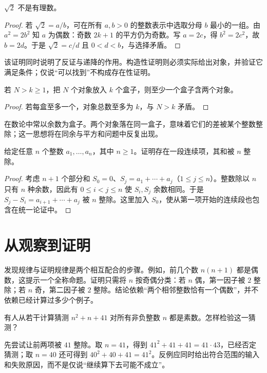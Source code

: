\documentclass[UTF8,12pt,a4paper,fontset=fandol]{ctexbook}
\begin{document}
\begin{example}
$\sqrt2$ 不是有理数。
\end{example}
\begin{proof}
若 $\sqrt2=a/b$，可在所有 $a,b>0$ 的整数表示中选取分母 $b$ 最小的一组。由 $a^2=2b^2$ 知 $a$ 为偶数：奇数 $2k+1$ 的平方仍为奇数。写 $a=2c$，得 $b^2=2c^2$，故 $b=2d$。于是 $\sqrt2=c/d$ 且 $0<d<b$，与选择矛盾。
\end{proof}

该证明同时说明了反证与递降的作用。构造性证明则必须实际给出对象，并验证它满足条件；仅说“可以找到”不构成存在性证明。

\begin{proposition}[抽屉原理]
若 $N>k\ge1$，把 $N$ 个对象放入 $k$ 个盒子，则至少一个盒子含两个对象。
\end{proposition}
\begin{proof}
若每盒至多一个，对象总数至多为 $k$，与 $N>k$ 矛盾。
\end{proof}

在数论中常以余数为盒子。两个对象落在同一盒子，意味着它们的差被某个整数整除；这一思想将在同余与平方和问题中反复出现。

\begin{example}[从部分和中寻找整除关系]
给定任意 $n$ 个整数 $a_1,\ldots,a_n$，其中 $n\ge1$。证明存在一段连续项，其和被 $n$ 整除。
\end{example}
\begin{proof}
考虑 $n+1$ 个部分和 $S_0=0$、$S_j=a_1+\cdots+a_j$（$1\le j\le n$）。整数除以 $n$ 只有 $n$ 种余数，因此有 $0\le i<j\le n$ 使 $S_i,S_j$ 余数相同。于是 $S_j-S_i=a_{i+1}+\cdots+a_j$ 被 $n$ 整除。这里加入 $S_0$，使从第一项开始的连续段也包含在统一论证中。
\end{proof}

\section{从观察到证明}

发现规律与证明规律是两个相互配合的步骤。例如，前几个数 $n(n+1)$ 都是偶数，这提示一个全称命题。证明只需将 $n$ 按奇偶分类：若 $n$ 偶，第一因子被 $2$ 整除；若 $n$ 奇，第二因子被 $2$ 整除。结论依赖“两个相邻整数恰有一个偶数”，并不依赖已经计算过多少个例子。

\begin{example}[计算很多项仍不能替代证明]
有人从若干计算猜测 $n^2+n+41$ 对所有非负整数 $n$ 都是素数。怎样检验这一猜测？
\end{example}
\begin{solve}
先尝试让前两项被 $41$ 整除。取 $n=41$，得到 $41^2+41+41=41\cdot43$，已经否定猜测；取 $n=40$ 还可得到 $40^2+40+41=41^2$。反例应同时给出符合范围的输入和失败原因，而不是仅说“继续算下去可能不成立”。
\end{solve}
\end{document}
